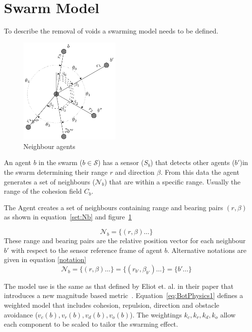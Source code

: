 \documentclass[preprint,12pt]{elsarticle}
\begin{document}
\section{Swarm Model}\label{sec:Swarm Model}
To describe the removal of voids a swarming model needs to be defined.


\begin{figure}
\begin{center}
\includegraphics[width=5cm]{figures/neighbours}
\end{center}
\caption{Neighbour agents\label{define:neighbours}}
\end{figure}

An agent $b$ in the swarm ($b\in\mathcal S$) has a sensor ($S_b$) that detects other agents
($b'$)in the swarm
determining their range $r$  and direction $\beta$.  From this data the agent generates a
set of neighbours ($\mathcal N_b$) that are within a specific range.  Usually the range of the
cohesion field $C_b$.

The Agent creates a set of neighbours containing range and bearing pairs
$(r,\beta)$ as shown in equation~\ref{set:Nb} and
figure~\ref{define:neighbours}

\begin{equation}
\mathcal N_b = \{ (r,\beta) \ldots \}
\label{set:Nb}
\end{equation}
These range and bearing pairs are the relative position vector for each
neighbour $b'$ with respect to the sensor reference frame of agent $b$.
Alternative notations are given in equation \ref{notation}
\begin{equation}
	\mathcal N_b = \{(r,\beta) \ldots \} = \{ (r_{b'}, \beta_{b'}) \ldots \} = \{
	b' \ldots \}
	\label{notation}
\end{equation}

The model use is the same as that defined by Eliot et. al. in their paper that introduces a new magnitude based metric~\cite{EKB:18}. 
Equation~\ref{eq:BotPhysics1} defines a weighted model that includes cohesion,
repulsion, direction and obstacle avoidance ($v_c(b), v_r(b),
v_d(b), v_o(b)$). 
The weightings $k_c, k_r, k_d, k_o$ allow each component to be scaled to tailor the swarming effect. 
\end{document}
